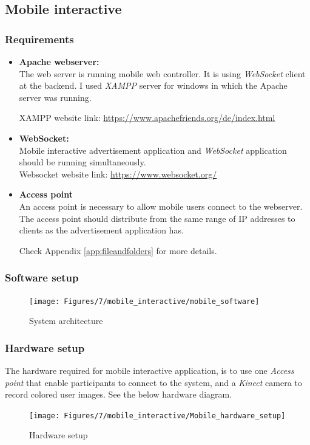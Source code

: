 \subsection{Mobile interactive}


\subsubsection{Requirements}
\begin{itemize}
\item \textbf{Apache webserver:}\\
The web server is running mobile web controller. It is using \emph{WebSocket} client at the backend. I used \emph{XAMPP} server for windows in which the Apache server was running. 

XAMPP website link: \url{https://www.apachefriends.org/de/index.html}  \\

\item \textbf{WebSocket:}\\
Mobile interactive advertisement application and \emph{WebSocket} application should be running simultaneously.  \\
Websocket website link: \url{https://www.websocket.org/}

\item \textbf{Access point}\\
An access point is necessary to allow mobile users connect to the webserver. The access point should distribute from the same range of IP addresses to clients as the advertisement application has.


Check Appendix \ref{app:fileandfolders} for more details.

\end{itemize}

\subsubsection{Software setup}

\begin{figure}[H]
    \centering
    \texttt{[image: Figures/7/mobile\_interactive/mobile\_software]}
    \caption{System architecture}%
    \label{fig:mobile_software_setup}%
\end{figure}


\subsubsection{Hardware setup}
The hardware required for mobile interactive application, is to use one \emph{Access point} that enable participants to connect to the system, and a \emph{Kinect} camera to record colored user images. See the below hardware diagram.

\begin{figure}[H]
    \centering
    \texttt{[image: Figures/7/mobile\_interactive/Mobile\_hardware\_setup]}
    \caption{Hardware setup}%
    \label{fig:mobile_hardware_setup}%
\end{figure}













